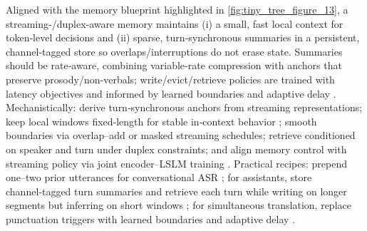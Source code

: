 Aligned with the memory blueprint highlighted in \autoref{fig:tiny_tree_figure_13}, a streaming‑/duplex‑aware memory maintains (i) a small, fast local context for token‑level decisions and (ii) sparse, turn‑synchronous summaries in a persistent, channel‑tagged store so overlaps/interruptions do not erase state. Summaries should be rate‑aware, combining variable‑rate compression with anchors that preserve prosody/non‑verbals; write/evict/retrieve policies are trained with latency objectives and informed by learned boundaries and adaptive delay \cite{guo2025streamuniachievingstreamingspeechtransla}. Mechanistically: derive turn‑synchronous anchors from streaming representations; keep local windows fixed‑length for stable in‑context behavior \cite{hsu2024exploringcontextlearningtextlessspeechla}; smooth boundaries via overlap–add or masked streaming schedules; retrieve conditioned on speaker and turn under duplex constraints; and align memory control with streaming policy via joint encoder–LSLM training \cite{guo2025streamuniachievingstreamingspeechtransla}. Practical recipes: prepend one–two prior utterances for conversational ASR \cite{li2025seewossubmissionmlcslmlessonslearnedspee}; for assistants, store channel‑tagged turn summaries and retrieve each turn while writing on longer segments but inferring on short windows \cite{nguyen2025qwenvsgemmaintegrationwhispercomparative}; for simultaneous translation, replace punctuation triggers with learned boundaries and adaptive delay \cite{guo2025streamuniachievingstreamingspeechtransla}.

